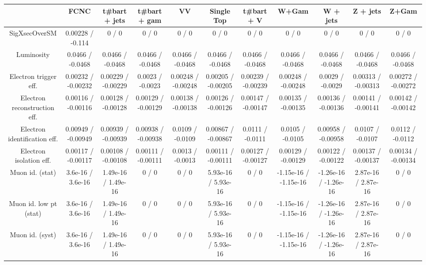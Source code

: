 \begin{table}[htbp]
\begin{center}
\footnotesize
\begin{tabular}{|c|c|c|c|c|c|c|c|c|c|c|}
\hline 
      & FCNC      & t#bar{t} + jets      & t#bar{t} +  gam      & VV      & Single Top      & t#bar{t} + V      & W+Gam      & W + jets      & Z + jets      & Z+Gam \\ 
\hline 
 SigXsecOverSM & 0.00228 / -0.114 & 0 / 0 & 0 / 0 & 0 / 0 & 0 / 0 & 0 / 0 & 0 / 0 & 0 / 0 & 0 / 0 & 0 / 0 \\ 
  Luminosity & 0.0466 / -0.0468 & 0.0466 / -0.0468 & 0.0466 / -0.0468 & 0.0466 / -0.0468 & 0.0466 / -0.0468 & 0.0466 / -0.0468 & 0.0466 / -0.0468 & 0.0466 / -0.0468 & 0.0466 / -0.0468 & 0.0466 / -0.0468 \\ 
  Electron trigger eff. & 0.00232 / -0.00232 & 0.00229 / -0.00229 & 0.0023 / -0.0023 & 0.00248 / -0.00248 & 0.00205 / -0.00205 & 0.00239 / -0.00239 & 0.00248 / -0.00248 & 0.0029 / -0.0029 & 0.00313 / -0.00313 & 0.00272 / -0.00272 \\ 
  Electron reconstruction eff. & 0.00116 / -0.00116 & 0.00128 / -0.00128 & 0.00129 / -0.00129 & 0.00138 / -0.00138 & 0.00126 / -0.00126 & 0.00147 / -0.00147 & 0.00135 / -0.00135 & 0.00136 / -0.00136 & 0.00141 / -0.00141 & 0.00142 / -0.00142 \\ 
  Electron identification eff. & 0.00949 / -0.00949 & 0.00939 / -0.00939 & 0.00938 / -0.00938 & 0.0109 / -0.0109 & 0.00867 / -0.00867 & 0.0111 / -0.0111 & 0.0105 / -0.0105 & 0.00958 / -0.00958 & 0.0107 / -0.0107 & 0.0112 / -0.0112 \\ 
  Electron isolation eff. & 0.00117 / -0.00117 & 0.00108 / -0.00108 & 0.00111 / -0.00111 & 0.0013 / -0.0013 & 0.00111 / -0.00111 & 0.00127 / -0.00127 & 0.00129 / -0.00129 & 0.00122 / -0.00122 & 0.00137 / -0.00137 & 0.00134 / -0.00134 \\ 
  Muon id. (stat) & 3.6e-16 / 3.6e-16 & 1.49e-16 / 1.49e-16 & 0 / 0 & 0 / 0 & 5.93e-16 / 5.93e-16 & 0 / 0 & -1.15e-16 / -1.15e-16 & -1.26e-16 / -1.26e-16 & 2.87e-16 / 2.87e-16 & 0 / 0 \\ 
  Muon id. low pt (stat) & 3.6e-16 / 3.6e-16 & 1.49e-16 / 1.49e-16 & 0 / 0 & 0 / 0 & 5.93e-16 / 5.93e-16 & 0 / 0 & -1.15e-16 / -1.15e-16 & -1.26e-16 / -1.26e-16 & 2.87e-16 / 2.87e-16 & 0 / 0 \\ 
  Muon id. (syst) & 3.6e-16 / 3.6e-16 & 1.49e-16 / 1.49e-16 & 0 / 0 & 0 / 0 & 5.93e-16 / 5.93e-16 & 0 / 0 & -1.15e-16 / -1.15e-16 & -1.26e-16 / -1.26e-16 & 2.87e-16 / 2.87e-16 & 0 / 0 \\ 

\end{tabular}
\end{center}
\end{table}
